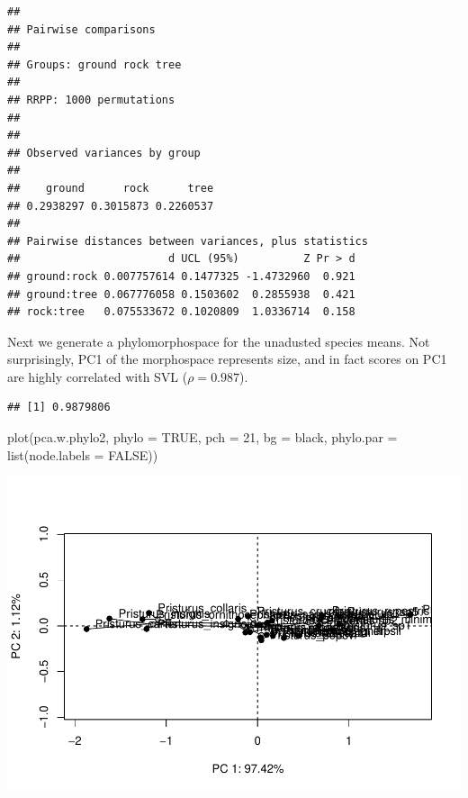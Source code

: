 \documentclass[
  11pt,
]{article}
\newenvironment{Shaded}{\begin{snugshade}}{\end{snugshade}}
\newcommand{\AttributeTok}[1]{\textcolor[rgb]{0.77,0.63,0.00}{#1}}
\newcommand{\ConstantTok}[1]{\textcolor[rgb]{0.00,0.00,0.00}{#1}}
\newcommand{\DecValTok}[1]{\textcolor[rgb]{0.00,0.00,0.81}{#1}}
\newcommand{\FunctionTok}[1]{\textcolor[rgb]{0.00,0.00,0.00}{#1}}
\newcommand{\NormalTok}[1]{#1}
\newcommand{\OtherTok}[1]{\textcolor[rgb]{0.56,0.35,0.01}{#1}}
\newcommand{\SpecialCharTok}[1]{\textcolor[rgb]{0.00,0.00,0.00}{#1}}
\newcommand{\StringTok}[1]{\textcolor[rgb]{0.31,0.60,0.02}{#1}}
\begin{document}
\begin{verbatim}
## 
## Pairwise comparisons
## 
## Groups: ground rock tree 
## 
## RRPP: 1000 permutations
## 
## 
## Observed variances by group
## 
##    ground      rock      tree 
## 0.2938297 0.3015873 0.2260537 
## 
## Pairwise distances between variances, plus statistics
##                       d UCL (95%)          Z Pr > d
## ground:rock 0.007757614 0.1477325 -1.4732960  0.921
## ground:tree 0.067776058 0.1503602  0.2855938  0.421
## rock:tree   0.075533672 0.1020809  1.0336714  0.158
\end{verbatim}

Next we generate a phylomorphospace for the unadusted species means. Not
surprisingly, PC1 of the morphospace represents size, and in fact scores
on PC1 are highly correlated with SVL (\(\rho=0.987\)).

\begin{Shaded}
\end{Shaded}

\begin{verbatim}
## [1] 0.9879806
\end{verbatim}

\begin{Shaded}
\begin{Highlighting}[]
\FunctionTok{plot}\NormalTok{(pca.w.phylo2, }\AttributeTok{phylo =} \ConstantTok{TRUE}\NormalTok{, }\AttributeTok{pch =} \DecValTok{21}\NormalTok{, }\AttributeTok{bg =} \StringTok{\textquotesingle{}black\textquotesingle{}}\NormalTok{, }
     \AttributeTok{phylo.par =} \FunctionTok{list}\NormalTok{(}\AttributeTok{node.labels =} \ConstantTok{FALSE}\NormalTok{))}
\end{Highlighting}
\end{Shaded}

\includegraphics{Pristurus-SuppInfo-R2_files/figure-latex/unnamed-chunk-11-1.pdf}
\end{document}
